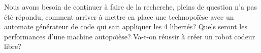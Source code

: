 \label{sec:Conclusion}

Nous avons besoin de continuer à faire de la recherche, pleins de question n'a pas été répondu, comment arriver à mettre en place une technopoïèse avec un automate générateur de code qui sait appliquer les 4 libertés? Quels seront les performances d'une machine autopoïèse? Va-t-on réussir à créer un robot codeur libre?



